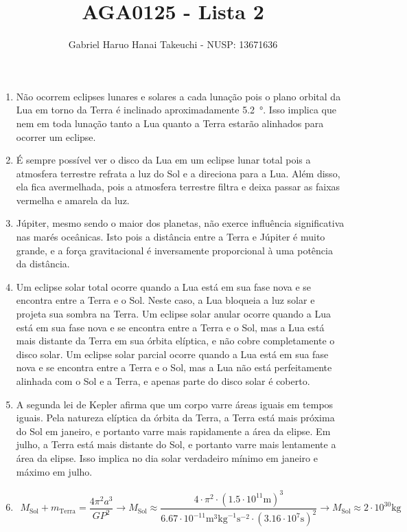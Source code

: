 \documentclass{article}
\author{Gabriel Haruo Hanai Takeuchi - NUSP: 13671636}
\title{AGA0125 - Lista 2}
\date{}
\begin{document}
\maketitle

\begin{enumerate}

\item Não ocorrem eclipses lunares e solares a cada lunação pois o plano orbital da Lua em torno da Terra é inclinado aproximadamente \SI{5.2}{\degree}. Isso implica que nem em toda lunação tanto a Lua quanto a Terra estarão alinhados para ocorrer um eclipse.

\item É sempre possível ver o disco da Lua em um eclipse lunar total pois a atmosfera terrestre refrata a luz do Sol e a direciona para a Lua. Além disso, ela fica avermelhada, pois a atmosfera terrestre filtra e deixa passar as faixas vermelha e amarela da luz.

\item Júpiter, mesmo sendo o maior dos planetas, não exerce influência significativa nas marés oceânicas. Isto pois a distância entre a Terra e Júpiter é muito grande, e a força gravitacional é inversamente proporcional à uma potência da distância.

\item Um eclipse solar total ocorre quando a Lua está em sua fase nova e se encontra entre a Terra e o Sol. Neste caso, a Lua bloqueia a luz solar e projeta sua sombra na Terra. Um eclipse solar anular ocorre quando a Lua está em sua fase nova e se encontra entre a Terra e o Sol, mas a Lua está mais distante da Terra em sua órbita elíptica, e não cobre completamente o disco solar. Um eclipse solar parcial ocorre quando a Lua está em sua fase nova e se encontra entre a Terra e o Sol, mas a Lua não está perfeitamente alinhada com o Sol e a Terra, e apenas parte do disco solar é coberto.

\item A segunda lei de Kepler afirma que um corpo varre áreas iguais em tempos iguais. Pela natureza elíptica da órbita da Terra, a Terra está mais próxima do Sol em janeiro, e portanto varre mais rapidamente a área da elipse. Em julho, a Terra está mais distante do Sol, e portanto varre mais lentamente a área da elipse. Isso implica no dia solar verdadeiro mínimo em janeiro e máximo em julho.

\item \begin{align*}
  M_{\text{Sol}} + m_{\text{Terra}} = \dfrac{4 \pi^2 a^3}{G P^2} \rightarrow
  M_{\text{Sol}} \approx \dfrac{4 \cdot \pi^2 \cdot (1.5 \cdot 10^{11} \si{\meter})^3}{6.67 \cdot 10^{-11} \si{\meter}^3 \si{\kilo\gram}^{-1} \si{\second}^{-2} \cdot (3.16 \cdot 10^7 \si{\second})^2} \rightarrow
  M_{\text{Sol}} \approx 2 \cdot 10^{30} \si{\kilo\gram}
\end{align*}


\end{enumerate}
\end{document}
